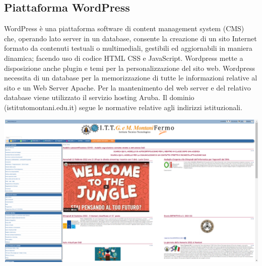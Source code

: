 \documentclass{article}
\begin{document}
	\subsection{\textbf{Piattaforma WordPress}}
	WordPress è una piattaforma software di content management system (CMS) che, operando lato server in un database, consente la creazione di un sito Internet formato da contenuti testuali o multimediali, gestibili ed aggiornabili in maniera dinamica; facendo uso di codice HTML CSS e JavaScript. Wordpress mette a disposizione anche plugin e temi per la personalizzazione del sito web. Wordpress necessita di un database per la memorizzazione di tutte le informazioni relative al sito e un Web Server Apache. Per la mantenimento del web server e del relativo database viene utilizzato il servizio hosting Aruba. Il dominio (istitutomontani.edu.it) segue le normative relative agli indirizzi istituzionali.	
	
	\includegraphics[scale=0.18]{ittmontaniex.png}
\end{document}

